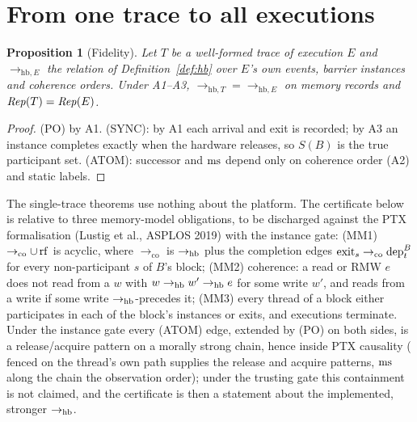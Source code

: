 \documentclass[11pt]{article}
\newtheorem{proposition}[theorem]{Proposition}
\theoremstyle{remark}
\newcommand{\CO}{\to_{\mathrm{co}}}\newcommand{\chain}{\rightsquigarrow}
\begin{document}
\section{From one trace to all executions}\label{sec:cert}

\begin{proposition}[Fidelity]\label{prop:fidelity}
Let $T$ be a well-formed trace of execution $E$ and $\to_{\mathrm{hb},E}$ the relation of
Definition~\ref{def:hb} over $E$'s own events, barrier instances and coherence orders.
Under A1--A3, $\to_{\mathrm{hb},T}=\to_{\mathrm{hb},E}$ on memory records and $\mathit{Rep}(T)=\mathit{Rep}(E)$.
\end{proposition}
\begin{proof}
(PO) by A1. (SYNC): by A1 each arrival and exit is recorded; by A3 an instance completes
exactly when the hardware releases, so $S(B)$ is the true participant set. (ATOM): successor
and $\operatorname{ms}$ depend only on coherence order (A2) and static labels.
\end{proof}

The single-trace theorems use nothing about the platform. The certificate below is
relative to three memory-model obligations, to be discharged against the PTX
formalisation (Lustig et al., ASPLOS 2019) with the instance gate: (MM1) $\CO\cup\rf$ is
acyclic, where $\CO$ is $\to_{\mathrm{hb}}$ plus the completion edges $\ext{s}\CO\dep{t}{B}$ for every
non-participant $s$ of $B$'s block; (MM2) coherence: a read or RMW $e$ does not read from a
$w$ with $w\to_{\mathrm{hb}} w'\to_{\mathrm{hb}} e$ for some write $w'$, and reads from a write if some write
$\to_{\mathrm{hb}}$-precedes it; (MM3) every thread of a block either participates in each of the block's
instances or exits, and executions terminate. Under the instance gate every (ATOM)
edge, extended by (PO) on both sides, is a release/acquire pattern on a morally strong
chain, hence inside PTX causality ($\mathrm{fenced}$ on the thread's own path supplies the
release and acquire patterns, $\operatorname{ms}$ along the chain the observation order); under the
trusting gate this containment is not claimed, and the certificate is then a statement
about the implemented, stronger $\to_{\mathrm{hb}}$.
\end{document}
